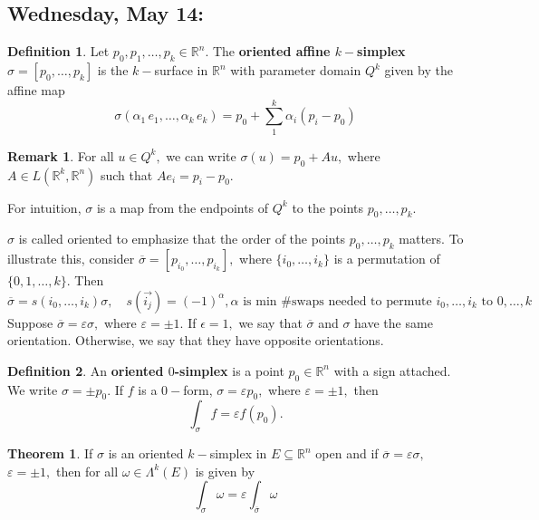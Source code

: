 \documentclass[10pt, oneside]{article}
\newcommand{\bbR}{\mathbb{R}}
\theoremstyle{definition}
\newtheorem{thm}{Theorem}
\newtheorem{defn}{Definition}
\newtheorem{rem}{Remark}
\begin{document}
\newpage
\subsection{Wednesday, May 14: }
\begin{defn}
    Let $p_0, p_1, \dots, p_k \in \bbR^n.$ The \textbf{oriented affine $k-$simplex} $\sigma = [p_0, \dots, p_k]$ is the $k-$surface in $\bbR^n$ with parameter domain $Q^k$ given by the affine map 
    \[\sigma(\alpha_1\,e_1, \dots, \alpha_k \,e_k) = p_0 + \sum_{1}^k \alpha_i(p_i - p_0)\]
\end{defn}
\begin{rem}
   For all $u \in Q^k,$ we can write $\sigma(u) = p_0 + Au,$  where $A \in L(\bbR^k, \bbR^n)$ such that $Ae_i = p_i - p_0.$ 

   For intuition, $\sigma$ is a map from the endpoints of $Q^k$ to the points $p_0, \dots, p_k.$ 

   $\sigma$ is called oriented to emphasize that the order of the points $p_0, \dots, p_k$ matters. To illustrate this, consider $\overline{\sigma} = [p_{i_0}, \dots, p_{i_k}],$ where $\{i_0, \dots, i_k\}$ is a permutation of $\{0,1,\dots, k\}.$ Then 
   \[\overline{\sigma} = s(i_0, \dots, i_k)\sigma, \quad s(\vec{i_j}) = (-1)^\alpha, \alpha\text{ is min \# swaps needed to permute $i_0, \dots, i_k$ to $0, \dots, k$}\] Suppose $\overline{\sigma} = \varepsilon\sigma,$ where $\varepsilon = \pm 1.$ If $\epsilon = 1,$ we say that $\overline{\sigma}$ and $\sigma$ have the same orientation. Otherwise, we say that they have opposite orientations.
\end{rem}

\begin{defn}
    An \textbf{oriented $0$-simplex} is a point $p_0 \in \bbR^n$ with a sign attached. We write $\sigma = \pm p_0.$ If $f$ is a $0-$form, $\sigma = \varepsilon p_0,$ where $\varepsilon = \pm1 ,$ then 
    \[\int_\sigma f = \varepsilon f(p_0).\]
\end{defn}
\begin{thm}
    If $\sigma$ is an oriented $k-$simplex in $E\subseteq \bbR^n$ open and if $\overline{\sigma} = \varepsilon \sigma,$ $\varepsilon = \pm 1,$ then for all $\omega \in \Lambda^k(E)$ is given by 
    \[\int_\sigma \omega = \varepsilon \int_{\overline{\sigma}}\omega\]
\end{thm}
\end{document}
